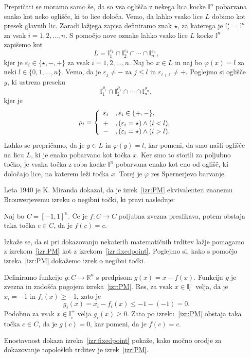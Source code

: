 \documentclass[mat1]{fmfdelo}
\newcommand{\R}{\mathbb R}
\newcommand{\I}{\mathbb I}
\newcommand{\0}{0}
\begin{document}
\begin{dokaz}
Prepričati se moramo samo še, da so vsa oglišča z nekega lica kocke $\I^n$ pobarvana enako kot neko oglišče, ki to lice določa. Vemo, da lahko vsako lice $L$ dobimo kot presek glavnih lic. Zaradi lažjega zapisa definiramo znak $\star$, za katerega je $\I_i^{\star} = \I^n$ za vsak $i = 1, 2, \dots, n$. S pomočjo nove oznake lahko vsako lice $L$ kocke $\I^n$ zapišemo kot 
$$L = \I_1^{\varepsilon_1} \cap \I_2^{\varepsilon_2} \cap \cdots \cap \I_n^{\varepsilon_n},$$
kjer je $\varepsilon_i \in \{ \star, -, + \}$ za vsak $i = 1, 2, \dots, n$. Naj bo $x \in L$ in naj bo $\varphi (x) = l$ za neki $l \in \{ 0, 1, \dots, n \}$. Vemo, da je $\varepsilon_j \neq -$ za $j \leq l$ in $\varepsilon_{l+1} \neq +$. Poglejmo si oglišče $y$, ki ustreza preseku 
$$\I_1^{\rho_1} \cap \I_2^{\rho_2} \cap \cdots \cap \I_n^{\rho_n},$$
kjer je
\[  \rho_i =  \left\{
\begin{array}{cl}\vspace{3pt}
	\varepsilon_i &, \varepsilon_i \in \{ +, - \},\\
	+ &, (\varepsilon_i = \star) \land (i < l), \\
	- &, (\varepsilon_i = \star) \land (i > l). \\
\end{array} 
\right. \]
Lahko se prepričamo, da je $y \in L$ in $\varphi (y) = l$, kar pomeni, da smo našli oglišče na licu $L$, ki je enako pobarvano kot točka $x$. Ker smo to storili za poljubno točko, je vsaka točka z roba kocke $\I^n$ pobarvana enako kot eno od oglišč, ki določajo lice, na katerem leži točka $x$. Torej je $\varphi$ res Spernerjevo barvanje.
\end{dokaz}
Leta 1940 je K. Miranda dokazal, da je izrek~\ref{izr:PM} ekvivalenten znanemu Brouwerjevemu izreku o negibni točki, ki pravi naslednje:
\begin{izrek}\label{izr:fixedpoint}
Naj bo $C = [-1, 1]^n$. Če je $f : C \to C$ poljubna zvezna preslikava, potem obstaja taka točka $c \in C$, da je $f(c) = c$.
\end{izrek}
Izkaže se, da si pri dokazovanju nekaterih matematičnih trditev lažje pomagamo z izrekom~\ref{izr:PM} kot z izrekom~\ref{izr:fixedpoint}. Poglejmo si, kako s pomočjo izreka~\ref{izr:PM} dokažemo izrek o negibni točki. 

\begin{dokaz}
Definiramo funkcijo $g : C \to \R^n$ s predpisom $g(x) = x - f(x)$. Funkcija $g$ je zvezna in zadošča pogojem izreka~\ref{izr:PM}. Res, za vsak $x \in \I_i^-$ velja, da je $x_i = -1$ in $f_i(x) \geq -1$, zato je 
$$g_i(x) = x_i - f_i(x) \leq -1 - (-1) =0.$$
Podobno za vsak $x \in \I_i^+$ velja $g_i(x) \geq 0$. Zato po izreku~\ref{izr:PM} obstaja taka točka $c \in C$, da je $g(c) = 0$, kar pomeni, da je $f(c) = c$.
\end{dokaz}
Enostavnost dokaza izreka~\ref{izr:fixedpoint} pokaže, kako močno orodje za dokazovanje topoloških trditev je izrek~\ref{izr:PM}.
\end{document}
